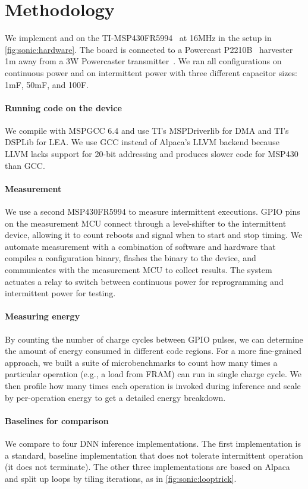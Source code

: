 \section{Methodology}
\label{sonic:methodology}

We implement \sonic and \tails on the TI-MSP430FR5994~\cite{msp430fr5994} at
16MHz in the setup in \autoref{fig:sonic:hardware}.
The board is connected to a
Powercast P2210B~\cite{powercastboard} harvester 1m away from a 3W Powercaster
transmitter~\cite{powercasttransmitter}. We ran all configurations on
continuous power and on intermittent power with three different capacitor
sizes: 1mF, 50mF, and 100\textmu F.

\figSONICMethod

\paragraph{Running code on the device}
We compile with MSPGCC 6.4 and use TI's MSPDriverlib for DMA and TI's DSPLib
for LEA. We use GCC instead of Alpaca's LLVM backend because LLVM lacks support
for 20-bit addressing and produces slower code for MSP430 than GCC.

\paragraph{Measurement}
We use a second MSP430FR5994 to measure intermittent executions.
%
GPIO pins on the measurement MCU connect through a level-shifter to the
intermittent device, allowing it to count reboots and signal when to start and
stop timing.
%
We automate measurement with a combination of software and hardware that
compiles a configuration binary, flashes the binary to the device, and
communicates with the measurement MCU to collect results.
%
The system actuates a relay to switch between continuous power for reprogramming
and intermittent power for testing.

\paragraph{Measuring energy}
By counting the number of charge cycles between GPIO pulses, we can determine
the amount of energy consumed in different code regions.
%
For a more fine-grained approach, we built a suite of 
microbenchmarks to count how many times a particular operation (e.g., a load from FRAM) can run in single charge cycle.
%
We then profile how many times each operation is invoked during inference
and scale by per-operation energy to get a detailed energy breakdown.

\paragraph{Baselines for comparison}
We compare \sonictails to four DNN inference implementations. The first
implementation is a standard, baseline implementation that does not tolerate
intermittent operation (it does not terminate).
The other three implementations are based on
Alpaca~\cite{alpaca} and split up loops by tiling iterations, as in \autoref{fig:sonic:looptrick}.
